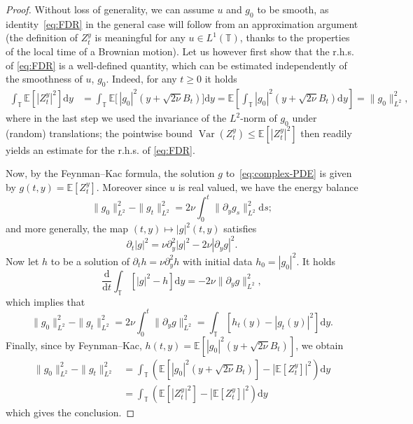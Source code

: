 \documentclass[11pt,oneside,reqno]{amsart}
\newcommand{\mathd}{\mathrm{d}}
\newcommand{\tmop}[1]{\ensuremath{\operatorname{#1}}}
\numberwithin{equation}{section}
\begin{document}
\begin{proof}
  Without loss of generality, we can assume $u$ and $g_0$ to be smooth, as
  identity~\eqref{eq:FDR} in the general case will follow from an approximation
  argument (the definition of $Z^y_t$ is meaningful for any $u \in L^1
  (\mathbb{T})$, thanks to the properties of the local time of a Brownian
  motion).
  Let us however first show that the r.h.s. of \eqref{eq:FDR} is a well-defined quantity, which can be estimated independently of the smoothness of $u$, $g_0$. Indeed, for any $t\geq 0$ it holds
\begin{align*}
\int_{\mathbb{T}} \mathbb{E}[|Z^y_t|^2] \mathd y
& = \int_{\mathbb{T}} \mathbb{E}\big[\,|g_0|^2(y+\sqrt{2\nu} B_t)\big] \mathd y
= \mathbb{E}\left[ \int_{\mathbb{T}} |g_0|^2(y+\sqrt{2\nu} B_t) \mathd y\right]
= \| g_0\|_{L^2}^2,
\end{align*}
%
where in the last step we used the invariance of the $L^2$-norm of $g_0$ under (random) translations; the pointwise bound $\tmop{Var} (Z^y_t)\leq \mathbb{E}[|Z^y_t|^2]$ then readily yields an estimate for the r.h.s. of \eqref{eq:FDR}.
  
  Now, by the Feynman--Kac formula, the solution $g$
  to~\eqref{eq:complex-PDE} is given by $g (t, y) =\mathbb{E} [Z^y_t]$.
  Moreover since $u$ is real valued, we have the energy balance
  \[ \| g_0 \|_{L^2}^2 - \| g_t \|_{L^2}^2 = 2 \nu \int_0^t \| \partial_y g_s
     \|_{L^2}^2 \mathd s ; \]
  and more generally, the map $(t, y) \mapsto | g |^2 (t,
  y)$ satisfies
  \[ \partial_t | g |^2 = \nu \partial_y^2 | g |^2 - 2 \nu | \partial_y g |^2
     . \]
  Now let $h$ to be a solution of $\partial_t h = \nu \partial_y^2 h$ with
  initial data $h_0 = | g_0 |^2$. It holds
  \[ \frac{\mathd}{\mathd t} \int_{\mathbb{T}} [| g |^2 - h] \mathd
     y = - 2 \nu \| \partial_y g \|_{L^2}^2, \]
  which implies that
  \[ \| g_0 \|_{L^2}^2 - \| g_t \|_{L^2}^2 = 2 \nu \int_0^t \| \partial_y g
     \|_{L^2}^2 = \int_{\mathbb{T}} [h_t (y) - | g_t (y) |^2] \mathd y. \]
  Finally, since by Feynman--Kac, $h (t, y) =\mathbb{E} \left[ | g_0|^2( y + \sqrt{2 \nu} B_t)  \right]$, we obtain
  \begin{align*}
       \| g_0 \|_{L^2}^2 - \| g_t \|_{L^2}^2
       & = \int_{\mathbb{T}} \left(
       \mathbb{E} \left[ | g_0 |^2( y + \sqrt{2 \nu} B_t)
       \right] - | \mathbb{E} [Z^y_t] |^2 \right) \mathd y\\
       & = \int_{\mathbb{T}} (\mathbb{E} [| Z^y_t |^2] - | \mathbb{E}
       [Z^y_t] |^2) \mathd y
  \end{align*}
  which gives the conclusion.
\end{proof}
\end{document}
